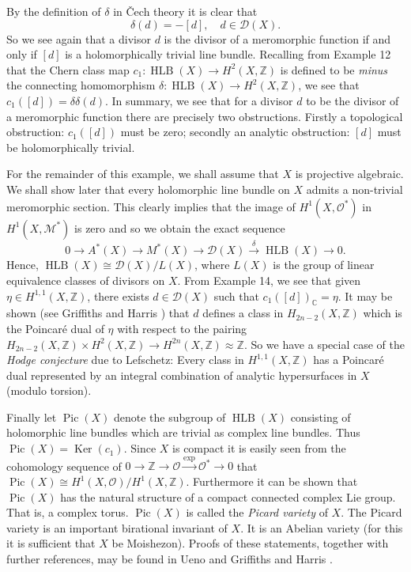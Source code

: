 \begin{enumerate}[start=10]
\[\]
By the definition of $\delta$ in \v{C}ech theory it is clear that
\[
\delta(d)=-[d],\quad d\in\mathcal D(X).
\]
So we see again that a divisor $d$ is the divisor of a meromorphic function if and only if $[d]$ is a holomorphically trivial line bundle. Recalling from Example 12 that the Chern class map $c_1:\operatorname{HLB}(X)\to H^2(X,\mathbb Z)$ is defined to be \emph{minus} the connecting homomorphism $\delta:\operatorname{HLB}(X)\to H^2(X,\mathbb Z)$, we see that $c_1([d])=\delta\delta(d)$. In summary, we see that for a divisor $d$ to be the divisor of a meromorphic function there are precisely two obstructions. Firstly a topological obstruction: $c_1([d])$ must be zero; secondly an analytic obstruction: $[d]$ must be holomorphically trivial.

For the remainder of this example, we shall assume that $X$ is projective algebraic. We shall show later that every holomorphic line bundle on $X$ admits a non-trivial meromorphic section. This clearly implies that the image of $H^1(X,\mathcal O^*)$ in $H^1(X,\mathcal M^*)$ is zero and so we obtain the exact sequence
\[
0\to A^*(X)\to M^*(X)\to\mathcal D(X)\xrightarrow\delta\operatorname{HLB}(X)\to0.
\]
Hence, $\operatorname{HLB}(X)\cong\mathcal D(X)/L(X)$, where $L(X)$ is the group of linear equivalence classes of divisors on $X$.
From Example 14, we see that given $\eta\in H^{1,1}(X,\mathbb Z)$, there exists $d\in\mathcal D(X)$ such that $c_1([d])_{\mathbb C}=\eta$. It may be shown (see Griffiths and Harris \cite{bib:II:griffiths-p-and-harris-j:1}) that $d$ defines a class in $H_{2n-2}(X,\mathbb Z)$ which is the Poincar\'e dual of $\eta$ with respect to the pairing $H_{2n-2}(X,\mathbb Z)\times H^2(X,\mathbb Z)\to H^{2n}(X,\mathbb Z)\approx\mathbb Z$. So we have a special case of the \emph{Hodge conjecture} due to Lefschetz: Every class in $H^{1,1}(X,\mathbb Z)$ has a Poincar\'e dual represented by an integral combination of analytic hypersurfaces in $X$ (modulo torsion).

Finally let $\operatorname{Pic}(X)$ denote the subgroup of $\operatorname{HLB}(X)$ consisting of holomorphic line bundles which are trivial as complex line bundles. Thus $\operatorname{Pic}(X)=\operatorname{Ker}(c_1)$. Since $X$ is compact it is easily seen from the cohomology sequence of $0\to\mathbb Z\to\mathcal O\xrightarrow{\exp}\mathcal O^*\to0$ that $\operatorname{Pic}(X)\cong H^1(X,\mathcal O)/H^1(X,\mathbb Z)$. Furthermore it can be shown that $\operatorname{Pic}(X)$ has the natural structure of a compact connected complex Lie group. That is, a complex torus. $\operatorname{Pic}(X)$ is called the \emph{Picard variety} of $X$. The Picard variety is an important birational invariant of $X$. It is an Abelian variety (for this it is sufficient that $X$ be Moishezon). Proofs of these statements, together with further references, may be found in Ueno \cite{bib:II:ueno-k:1} and Griffiths and Harris \cite{bib:II:griffiths-p-and-harris-j:1}.
\end{enumerate}
